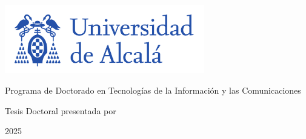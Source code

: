 \thispagestyle{empty}
\large
\begin{center}

  \color{pantone293}

  \centerline{\includegraphics[height=3cm]{include/img/logo_uah_nombre.pdf}}
  
  \vspace{2cm}

  \huge{Programa de Doctorado en Tecnologías de la Información y las Comunicaciones}

  \vspace{2cm}

  \Huge\textbf{\titulotesis}

  \vspace{5cm}

  \huge{{Tesis Doctoral presentada por}}\\
  \vspace{2mm}
  \huge{\textbf{\autortesis}}

  \vspace{10mm}

  \color{black}
  
\end{center}

\begin{bottomparagraph}
  \begin{center}

    \color{pantone293}

      \huge {2025}
    \color{black}

  \end{center}
\end{bottomparagraph}